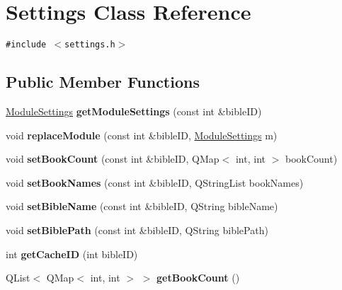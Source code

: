 \hypertarget{classSettings}{
\section{Settings Class Reference}
\label{classSettings}
}
{\tt \#include $<$settings.h$>$}

\subsection*{Public Member Functions}
\begin{CompactItemize}
\item 
\hypertarget{classSettings_823da407a40ae2fbe3031538cf498472}{
\hyperlink{classModuleSettings}{ModuleSettings} \textbf{getModuleSettings} (const int \&bibleID)}
\label{classSettings_823da407a40ae2fbe3031538cf498472}

\item 
\hypertarget{classSettings_87353d9e5ca7e452c222b14772f8508b}{
void \textbf{replaceModule} (const int \&bibleID, \hyperlink{classModuleSettings}{ModuleSettings} m)}
\label{classSettings_87353d9e5ca7e452c222b14772f8508b}

\item 
\hypertarget{classSettings_1a2648f466694632ffe5eb7df750bd90}{
void \textbf{setBookCount} (const int \&bibleID, QMap$<$ int, int $>$ bookCount)}
\label{classSettings_1a2648f466694632ffe5eb7df750bd90}

\item 
\hypertarget{classSettings_3468c250761c7db0e4b61f9e67ecb079}{
void \textbf{setBookNames} (const int \&bibleID, QStringList bookNames)}
\label{classSettings_3468c250761c7db0e4b61f9e67ecb079}

\item 
\hypertarget{classSettings_9733ed2848412829c96150f8d3cdbd55}{
void \textbf{setBibleName} (const int \&bibleID, QString bibleName)}
\label{classSettings_9733ed2848412829c96150f8d3cdbd55}

\item 
\hypertarget{classSettings_9abc0c2e1e4558e42318b041bb691dea}{
void \textbf{setBiblePath} (const int \&bibleID, QString biblePath)}
\label{classSettings_9abc0c2e1e4558e42318b041bb691dea}

\item 
\hypertarget{classSettings_36a9eb5b9a02bcd8f2e28f944162992a}{
int \textbf{getCacheID} (int bibleID)}
\label{classSettings_36a9eb5b9a02bcd8f2e28f944162992a}

\item 
\hypertarget{classSettings_698e614462375008abf61710997b1832}{
QList$<$ QMap$<$ int, int $>$ $>$ \textbf{getBookCount} ()}
\label{classSettings_698e614462375008abf61710997b1832}


\end{CompactItemize}
